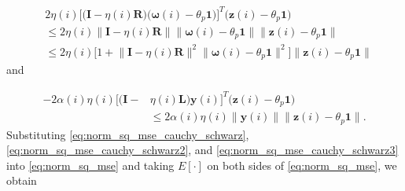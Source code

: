 \documentclass[journal]{IEEEtran}
\begin{document}
\vspace{-4mm}
\small
\begin{align}
&2\eta(i)\bigg[\Big(\mathbf{I} - \eta(i)\mathbf{R} \Big)  \big(\bm{\omega}(i) - {\theta_p}\mathbf{1} \big)\bigg]^T \Big(\mathbf{z}(i)- {\theta_p}\mathbf{1} \Big) \nonumber \\
&\le 2\eta(i)\Big\|\mathbf{I} - \eta(i)\mathbf{R}  \Big\| \Big\| \bm{\omega}(i) - {\theta_p}\mathbf{1} \Big\| \Big\|\mathbf{z}(i)- {\theta_p}\mathbf{1} \Big\| \nonumber \\
&\le 2\eta(i)\bigg[ 1+ \Big\|\mathbf{I} - \eta(i)\mathbf{R}  \Big\|^2 \Big\| \bm{\omega}(i) - {\theta_p}\mathbf{1} \Big\|^2 \bigg] \Big\|\mathbf{z}(i)- {\theta_p}\mathbf{1} \Big\| \label{eq:norm_sq_mse_cauchy_schwarz2}
\end{align}
\normalsize
and 

\vspace{-4mm}
\small
\begin{align}
- 2\alpha(i)\eta(i)\bigg[ \Big(\mathbf{I} - &\eta(i) \mathbf{L}\Big)   \mathbf{y}(i)\bigg]^T \Big(\mathbf{z}(i)- {\theta_p}\mathbf{1} \Big)\nonumber \\
&\le 2\alpha(i)\eta(i)\big\| \mathbf{y}(i) \big\| \big\|\mathbf{z}(i)- {\theta_p}\mathbf{1} \big\| . \label{eq:norm_sq_mse_cauchy_schwarz3}
\end{align}
\normalsize
Substituting \eqref{eq:norm_sq_mse_cauchy_schwarz}, \eqref{eq:norm_sq_mse_cauchy_schwarz2}, and \eqref{eq:norm_sq_mse_cauchy_schwarz3} into \eqref{eq:norm_sq_mse} and taking $E[\cdot]$ on both sides of \eqref{eq:norm_sq_mse}, we obtain
\end{document}
